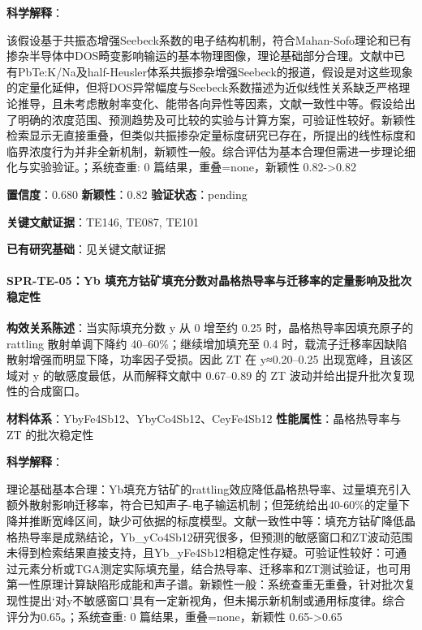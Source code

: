 \documentclass[12pt,a4paper]{ctexart}
\begin{document}
\textbf{科学解释}：

该假设基于共振态增强Seebeck系数的电子结构机制，符合Mahan-Sofo理论和已有掺杂半导体中DOS畸变影响输运的基本物理图像，理论基础部分合理。文献中已有PbTe:K/Na及half-Heusler体系共振掺杂增强Seebeck的报道，假设是对这些现象的定量化延伸，但将DOS异常幅度与Seebeck系数描述为近似线性关系缺乏严格理论推导，且未考虑散射率变化、能带各向异性等因素，文献一致性中等。假设给出了明确的浓度范围、预测趋势及可比较的实验与计算方案，可验证性较好。新颖性检索显示无直接重叠，但类似共振掺杂定量标度研究已存在，所提出的线性标度和临界浓度行为并非全新机制，新颖性一般。综合评估为基本合理但需进一步理论细化与实验验证。；系统查重: 0 篇结果，重叠=none，新颖性 0.82-\textgreater0.82

\textbf{置信度}：0.680 \textbar{} \textbf{新颖性}：0.82 \textbar{} \textbf{验证状态}：pending

\textbf{关键文献证据}：TE146, TE087, TE101

\textbf{已有研究基础}：见关键文献证据

\paragraph{SPR-TE-05：Yb 填充方钴矿填充分数对晶格热导率与迁移率的定量影响及批次稳定性}\label{spr-te-05yb-ux586bux5145ux65b9ux94b4ux77ffux586bux5145ux5206ux6570ux5bf9ux6676ux683cux70edux5bfcux7387ux4e0eux8fc1ux79fbux7387ux7684ux5b9aux91cfux5f71ux54cdux53caux6279ux6b21ux7a33ux5b9aux6027}

\textbf{构效关系陈述}：当实际填充分数 y 从 0 增至约 0.25 时，晶格热导率因填充原子的 rattling 散射单调下降约 40--60\%；继续增加填充至 0.4 时，载流子迁移率因缺陷散射增强而明显下降，功率因子受损。因此 ZT 在 y≈0.20--0.25 出现宽峰，且该区域对 y 的敏感度最低，从而解释文献中 0.67--0.89 的 ZT 波动并给出提升批次复现性的合成窗口。

\textbf{材料体系}：YbyFe4Sb12、YbyCo4Sb12、CeyFe4Sb12 \textbar{} \textbf{性能属性}：晶格热导率与 ZT 的批次稳定性

\textbf{科学解释}：

理论基础基本合理：Yb填充方钴矿的rattling效应降低晶格热导率、过量填充引入额外散射影响迁移率，符合已知声子-电子输运机制；但笼统给出40-60\%的定量下降并推断宽峰区间，缺少可依据的标度模型。文献一致性中等：填充方钴矿降低晶格热导率是成熟结论，Yb\_yCo4Sb12研究很多，但预测的敏感窗口和ZT波动范围未得到检索结果直接支持，且Yb\_yFe4Sb12相稳定性存疑。可验证性较好：可通过元素分析或TGA测定实际填充量，结合热导率、迁移率和ZT测试验证，也可用第一性原理计算缺陷形成能和声子谱。新颖性一般：系统查重无重叠，针对批次复现性提出`对y不敏感窗口'具有一定新视角，但未揭示新机制或通用标度律。综合评分为0.65。；系统查重: 0 篇结果，重叠=none，新颖性 0.65-\textgreater0.65
\end{document}
